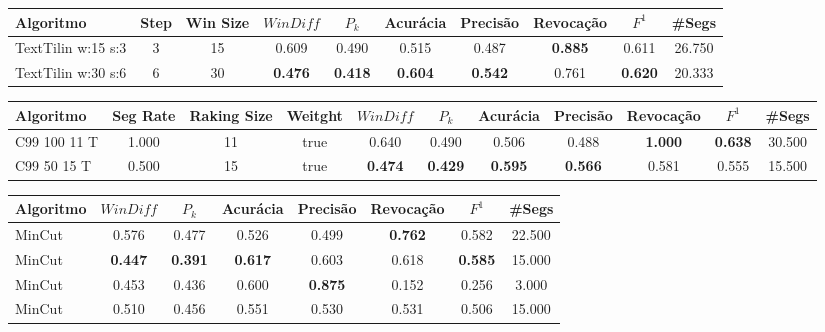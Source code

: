 \documentclass{article}
\begin{document}
 

\begin{longtable}[c]{|l|c|c|c|c|c|c|c|c|c|} 
\hline 
Algoritmo & Step & Win Size & $WinDiff$ & $P_k$ & Acurácia & Precisão & Revocação & $F^1$ & \#Segs\\ \hline 
TextTilin w:15 s:3 & 3 & 15 & 0.609 & 0.490 & 0.515 & 0.487 & \cellcolor{gray!20} \textbf{0.885} & 0.611 & 26.750  \\ \hline 
 TextTilin w:30 s:6 & 6 & 30 & \cellcolor{gray!20} \textbf{0.476} & \cellcolor{gray!20} \textbf{0.418} & \cellcolor{gray!20} \textbf{0.604} & \cellcolor{gray!20} \textbf{0.542} & 0.761 & \cellcolor{gray!20} \textbf{0.620} & 20.333  \\ \hline 
 \end{longtable} 


\begin{longtable}[c]{|l|c|c|c|c|c|c|c|c|c|c|} 
\hline 
Algoritmo & Seg Rate & Raking Size & Weitght & $WinDiff$ & $P_k$ & Acurácia & Precisão & Revocação & $F^1$ & \#Segs\\ \hline 
C99 100 11 T & 1.000 & 11 & true & 0.640 & 0.490 & 0.506 & 0.488 & \cellcolor{gray!20} \textbf{1.000} & \cellcolor{gray!20} \textbf{0.638} & 30.500  \\ \hline 
 C99 50 15 T & 0.500 & 15 & true & \cellcolor{gray!20} \textbf{0.474} & \cellcolor{gray!20} \textbf{0.429} & \cellcolor{gray!20} \textbf{0.595} & \cellcolor{gray!20} \textbf{0.566} & 0.581 & 0.555 & 15.500  \\ \hline 
 \end{longtable} 


\begin{longtable}[c]{|l|c|c|c|c|c|c|c|} 
\hline 
Algoritmo & $WinDiff$ & $P_k$ & Acurácia & Precisão & Revocação & $F^1$ & \#Segs\\ \hline 
MinCut & 0.576 & 0.477 & 0.526 & 0.499 & \cellcolor{gray!20} \textbf{0.762} & 0.582 & 22.500  \\ \hline 
 MinCut & \cellcolor{gray!20} \textbf{0.447} & \cellcolor{gray!20} \textbf{0.391} & \cellcolor{gray!20} \textbf{0.617} & 0.603 & 0.618 & \cellcolor{gray!20} \textbf{0.585} & 15.000  \\ \hline 
 MinCut & 0.453 & 0.436 & 0.600 & \cellcolor{gray!20} \textbf{0.875} & 0.152 & 0.256 & 3.000  \\ \hline 
 MinCut & 0.510 & 0.456 & 0.551 & 0.530 & 0.531 & 0.506 & 15.000  \\ \hline 
 \end{longtable} 
\end{document}
